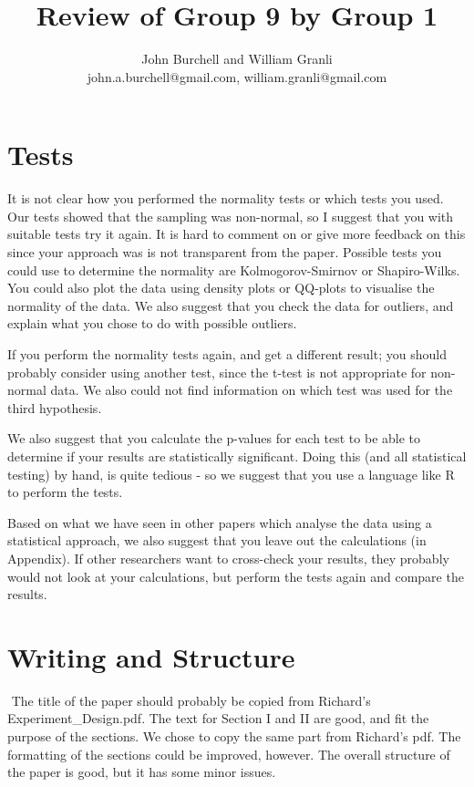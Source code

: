 \documentclass[times, 10pt,twocolumn]{article}
\begin{document}
\title{Review of Group 9 by Group 1}

\author{John Burchell and William Granli \\
john.a.burchell@gmail.com, william.granli@gmail.com}



\maketitle
\thispagestyle{empty}




\section{Tests}
It is not clear how you performed the normality tests or which tests you used. Our tests showed that the sampling was non-normal, so I suggest that you with suitable tests try it again. It is hard to comment on or give more feedback on this since your approach was is not transparent from the paper. Possible tests you could use to determine the normality are Kolmogorov-Smirnov or Shapiro-Wilks. You could also plot the data using density plots or QQ-plots to visualise the normality of the data. We also suggest that you check the data for outliers, and explain what you chose to do with possible outliers. 

If you perform the normality tests again, and get a different result; you should probably consider using another test, since the t-test is not appropriate for non-normal data. We also could not find information on which test was used for the third hypothesis. 

We also suggest that you calculate the p-values for each test to be able to determine if your results are statistically significant. Doing this (and all statistical testing) by hand, is quite tedious - so we suggest that you use a language like R to perform the tests. 

Based on what we have seen in other papers which analyse the data using a statistical approach, we also suggest that you leave out the calculations (in Appendix). If other researchers want to cross-check your results, they probably would not look at your calculations, but perform the tests again and compare the results. 

\section{Writing and Structure}​​
The title of the paper should probably be copied from Richard's Experiment\_Design.pdf. The text for Section I and II are good, and fit the purpose of the sections. We chose to copy the same part from Richard's pdf. The formatting of the sections could be improved, however. The overall structure of the paper is good, but it has some minor issues. 
\end{document}

